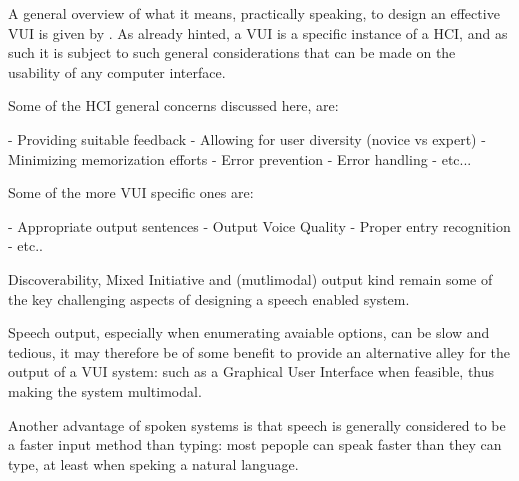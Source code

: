 A general overview of what it means, practically speaking, to design an effective VUI is given by \cite{farinazzo2010empirical}. As already hinted, a VUI is a specific instance of a HCI, and as such it is subject to such general considerations that can be made on the usability of any computer interface.

Some of the HCI general concerns discussed here, are:

-  Providing suitable feedback
-  Allowing for user diversity (novice vs expert)
-  Minimizing memorization efforts
-  Error prevention
-  Error handling
-  etc...

Some of the more VUI specific ones are:

- Appropriate output sentences
- Output Voice Quality
- Proper entry recognition
- etc..

Discoverability, Mixed Initiative and (mutlimodal) output kind remain some of the key challenging aspects of designing a speech enabled system. 

Speech output, especially when enumerating avaiable options, can be slow and tedious, it may therefore be of some benefit to provide an alternative alley for the output of a VUI system: such as a Graphical User Interface when feasible, thus making the system multimodal.

Another advantage of spoken systems is that speech is generally considered to be a faster input method than typing: most pepople can speak faster than they can type, at least when speking a natural language.


